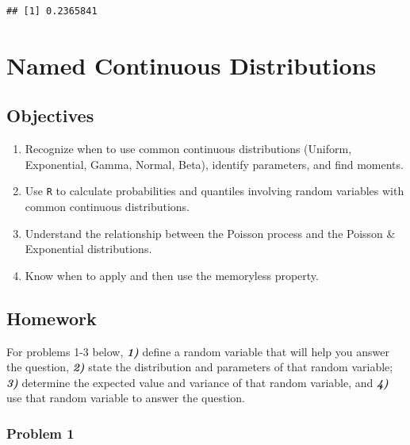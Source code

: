 \documentclass[
]{book}
\providecommand{\tightlist}{%
  \setlength{\itemsep}{0pt}\setlength{\parskip}{0pt}}
\begin{document}
\begin{verbatim}
## [1] 0.2365841
\end{verbatim}

\hypertarget{CONTNNAMED}{%
\chapter{Named Continuous Distributions}\label{CONTNNAMED}}

\newcommand{\E}{\mbox{E}}
\newcommand{\Var}{\mbox{Var}}
\newcommand{\Cov}{\mbox{Cov}}
\newcommand{\Prob}{\mbox{P}}
\newcommand{\diff}{\,\mathrm{d}}

\hypertarget{objectives-12}{%
\section{Objectives}\label{objectives-12}}

\begin{enumerate}
\def\labelenumi{\arabic{enumi})}
\tightlist
\item
  Recognize when to use common continuous distributions (Uniform, Exponential, Gamma, Normal, Beta), identify parameters, and find moments.\\
\item
  Use \texttt{R} to calculate probabilities and quantiles involving random variables with common continuous distributions.\\
\item
  Understand the relationship between the Poisson process and the Poisson \& Exponential distributions.\\
\item
  Know when to apply and then use the memoryless property.
\end{enumerate}

\hypertarget{homework-12}{%
\section{Homework}\label{homework-12}}

For problems 1-3 below, \textbf{\emph{1)}} define a random variable that will help you answer the question, \textbf{\emph{2)}} state the distribution and parameters of that random variable; \textbf{\emph{3)}} determine the expected value and variance of that random variable, and \textbf{\emph{4)}} use that random variable to answer the question.

\hypertarget{problem-1-12}{%
\subsection{Problem 1}\label{problem-1-12}}
\end{document}
